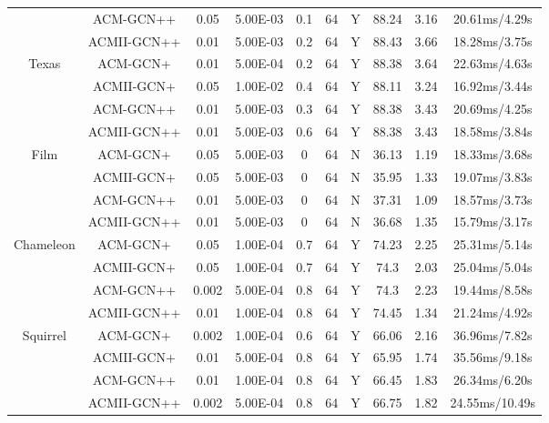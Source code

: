 \documentclass{article}
\newcommand{\0}{{\boldsymbol{0}}}
\newcommand{\6}{{\partial}}
\newcommand{\8}{{\infty}}
\newcommand{\4}{{\nabla}}
\begin{document}
\begin{table}[htbp]
{\begin{tabular}{c|c|cccccccc}
          & ACM-GCN++ & 0.05  & 5.00E-03 & 0.1   & 64    & Y     & 88.24 & 3.16  & 20.61ms/4.29s \\
          & ACMII-GCN++ & 0.01  & 5.00E-03 & 0.2   & 64    & Y     & 88.43 & 3.66  & 18.28ms/3.75s \\
          \midrule
    \multirow{4}[0]{*}{{Texas}} & ACM-GCN+ & 0.01  & 5.00E-04 & 0.2   & 64    & Y     & 88.38 & 3.64  & 22.63ms/4.63s \\
          & ACMII-GCN+ & 0.05  & 1.00E-02 & 0.4   & 64    & Y     & 88.11 & 3.24  & 16.92ms/3.44s \\
          & ACM-GCN++ & 0.01  & 5.00E-03 & 0.3   & 64    & Y     & 88.38 & 3.43  & 20.69ms/4.25s \\
          & ACMII-GCN++ & 0.01  & 5.00E-03 & 0.6   & 64    & Y     & 88.38 & 3.43  & 18.58ms/3.84s \\
          \midrule
    \multirow{4}[0]{*}{{Film}} & ACM-GCN+ & 0.05  & 5.00E-03 & 0     & 64    & N     & 36.13 & 1.19  & 18.33ms/3.68s \\
          & ACMII-GCN+ & 0.05  & 5.00E-03 & 0     & 64    & N     & 35.95 & 1.33  &  19.07ms/3.83s \\
          & ACM-GCN++ & 0.01  & 5.00E-03 & 0     & 64    & N     & 37.31 & 1.09  & 18.57ms/3.73s \\
          & ACMII-GCN++ & 0.01  & 5.00E-03 & 0     & 64    & N     & 36.68 & 1.35  & 15.79ms/3.17s \\
          \midrule
    \multirow{4}[0]{*}{{Chameleon}} & ACM-GCN+ & 0.05  & 1.00E-04 & 0.7   & 64    & Y     & 74.23 & 2.25  & 25.31ms/5.14s \\
          & ACMII-GCN+ & 0.05  & 1.00E-04 & 0.7   & 64    & Y     & 74.3  & 2.03  & 25.04ms/5.04s \\
          & ACM-GCN++ & 0.002 & 5.00E-04 & 0.8   & 64    & Y     & 74.3  & 2.23  & 19.44ms/8.58s \\
          & ACMII-GCN++ & 0.01  & 1.00E-04 & 0.8   & 64    & Y     & 74.45 & 1.34  & 21.24ms/4.92s \\
          \midrule
    \multirow{4}[0]{*}{{Squirrel}} & ACM-GCN+ & 0.002 & 1.00E-04 & 0.6   & 64    & Y     & 66.06 & 2.16  & 36.96ms/7.82s \\
          & ACMII-GCN+ & 0.01  & 5.00E-04 & 0.8   & 64    & Y     & 65.95 & 1.74  & 35.56ms/9.18s \\
          & ACM-GCN++ & 0.01  & 1.00E-04 & 0.8   & 64    & Y     & 66.45 & 1.83  & 26.34ms/6.20s \\
          & ACMII-GCN++ & 0.002 & 5.00E-04 & 0.8   & 64    & Y     & 66.75 & 1.82  &  24.55ms/10.49s \\

\end{tabular}}
\end{table}
\end{document}
